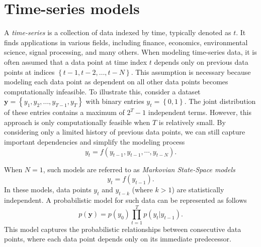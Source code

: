 \section{Time-series models}\label{appendix:defs:time-series-models}

A \textit{time-series} is a collection of data indexed by time, typically denoted as $t$.
It finds applications in various fields, including finance, economics, environmental science,
signal processing, and many others.
When modeling time-series data, it is often assumed that a data point at time index $t$
depends only on previous data points at indices $\left\{ t-1, t-2, \dots, t-N\right\}$.
This assumption is necessary because modeling each data point as dependent on all other data
points becomes computationally infeasible.
To illustrate this, consider a dataset $\bm{y} = \left\{ y_1, y_2, \dots, y_{T - 1}, y_T
    \right\}$ with binary entries $y_t = \left\{0, 1\right\}$.
The joint distribution of these entries contains a maximum of $2^T - 1$ independent terms.
However, this approach is only computationally feasible when $T$ is relatively small.
By considering only a limited history of previous data points, we can still capture important
dependencies and simplify the modeling process \begin{equation}
    y_t = f(y_{t - 1}, y_{t - 1}, \cdots, y_{t - N}).
\end{equation}

When
$N = 1$, such models are referred to as \textit{Markovian State-Space models}
\begin{equation}
    y_{t} = f(y_{t - 1}).
\end{equation} In these models, data points $y_t$ and $y_{t - k}$ (where $k > 1$) are
statistically independent.
A probabilistic model for such data can be represented as follows \begin{equation}
p(\bm{y}) = p(y_{0})\prod_{t = 1}^{T} p(y_t\vert y_{t - 1}).
\end{equation} This
model captures the probabilistic relationships between consecutive data points, where each
data point depends only on its immediate predecessor.

